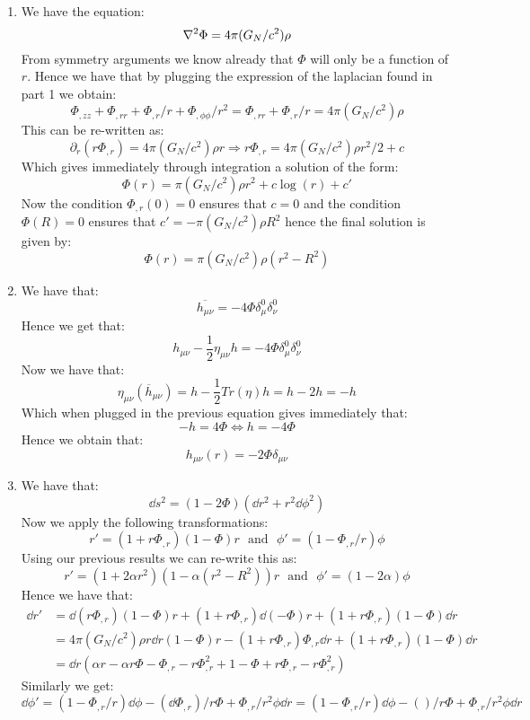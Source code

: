 \documentclass[10pt,a4paper]{article}
\begin{document}
\begin{enumerate}

\item We have the equation:
\[
\laplacian \Phi = 4\pi (G_N/c^2)\rho 
\]
From symmetry arguments we know already that $\Phi$ will only be a function of $r$. Hence we have that by plugging the expression of the laplacian found in part 1 we obtain:
\[
\Phi_{,zz} + \Phi_{,rr} + \Phi_{,r}/r + \Phi_{,\phi\phi}/r^2 = \Phi_{,rr} + \Phi_{,r}/r =  4 \pi (G_N/c^2) \rho
\]
This can be re-written as:
\[
\partial_r(r \Phi_{,r}) = 4 \pi (G_N /c^2)\rho r \Rightarrow r \Phi_{,r} = 4\pi (G_N/c^2) \rho r^{2}/2 + c
\]
Which gives immediately through integration a solution of the form:
\[
\Phi(r) = \pi (G_N/c^2) \rho r^2  + c \log(r) + c'
\]
Now the condition $\Phi_{,r}(0) = 0$ ensures that $c = 0$ and the condition $\Phi(R) = 0$ ensures that $c' = - \pi (G_N/c^2) \rho R^2$ hence the final solution is given by:
\[
\Phi(r) = \pi(G_N/c^2)\rho(r^2 - R^2)
\]

\item We have that:
\[
\overline{h_{\mu \nu}} = -4 \Phi \delta^0_\mu \delta^0_\nu
\]
Hence we get that:
\[
h_{\mu \nu} - \frac{1}{2} \eta_{\mu \nu} h = - 4 \Phi \delta^0_\mu \delta^0_\nu
\]
Now we have that:
\[
\eta_{\mu\nu}(\overline{h}_{\mu\nu}) = h - \frac{1}{2} Tr(\eta) h = h - 2h = - h
\]
Which when plugged in the previous equation gives immediately that:
\[
-h = 4 \Phi \Leftrightarrow h = -4 \Phi
\]
Hence we obtain that:
\[
h_{\mu \nu}(r) = - 2 \Phi \delta_{\mu \nu}
\]


\item We have that:
\[
\dd s^2 = (1 - 2 \Phi) (\dd r^2 + r^2 \dd \phi^2)
\]
Now we apply the following transformations:
\[
r' = (1 + r \Phi_{,r})(1 - \Phi) r  \mbox{~~and~~} \phi' = (1 - \Phi_{,r}/r)\phi
\]
Using our previous results we can re-write this as:
\[
r' = (1 + 2\alpha r^2)(1 - \alpha(r^2 - R^2)) r \mbox{~~and~~} \phi' = (1 - 2\alpha) \phi 
\]
Hence we have that:
\begin{align*}
\dd r' &= \dd (r \Phi_{,r}) (1 - \Phi) r + (1 + r \Phi_{,r}) \dd(-\Phi) r + (1 + r \Phi_{,r})(1 - \Phi)\dd r\\
&= 4\pi(G_N/c^2)\rho r \dd r (1 - \Phi) r - (1 + r \Phi_{,r}) \Phi_{,r} \dd r + (1 + r \Phi_{,r})(1 - \Phi)\dd r \\
&= \dd r \left( \alpha r - \alpha r \Phi - \Phi_{,r} - r \Phi_{,r}^2 + 1 - \Phi + r \Phi_{,r} - r \Phi_{,r}^2 \right)
\end{align*}
Similarly we get:
\[
\dd \phi' = (1 - \Phi_{,r}/r)\dd \phi - (\dd \Phi_{,r})/r \Phi + \Phi_{,r}/r^2 \phi \dd r = (1 - \Phi_{,r}/r)\dd \phi - ()/r \Phi + \Phi_{,r}/r^2 \phi \dd r
\]


\end{enumerate}
\end{document}
